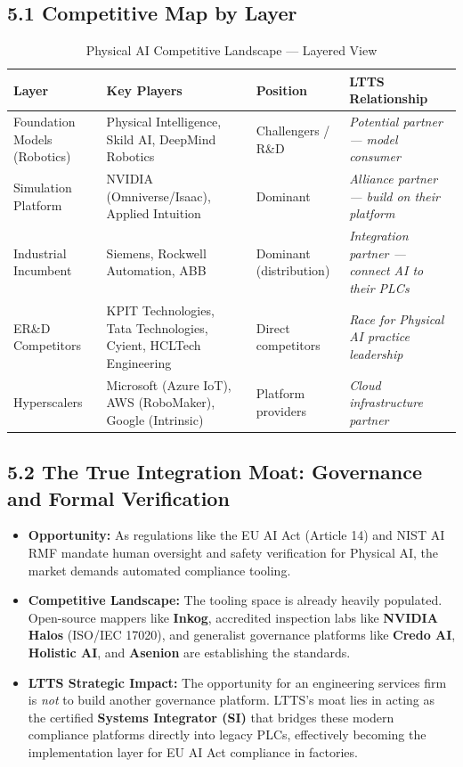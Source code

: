 \documentclass[11pt,a4paper]{article}
\begin{document}
\subsection{5.1 Competitive Map by Layer}
\begin{table}[h!]
\centering
\small
\begin{tabularx}{\textwidth}{@{}l X l X@{}}
\toprule
\textbf{Layer} & \textbf{Key Players} & \textbf{Position} & \textbf{LTTS Relationship} \\
\midrule
Foundation Models (Robotics) & Physical Intelligence, Skild AI, DeepMind Robotics & Challengers / R\&D & \textit{Potential partner --- model consumer} \\
Simulation Platform & NVIDIA (Omniverse/Isaac), Applied Intuition & Dominant & \textit{Alliance partner --- build on their platform} \\
Industrial Incumbent & Siemens, Rockwell Automation, ABB & Dominant (distribution) & \textit{Integration partner --- connect AI to their PLCs} \\
ER\&D Competitors & KPIT Technologies, Tata Technologies, Cyient, HCLTech Engineering & Direct competitors & \textit{Race for Physical AI practice leadership} \\
Hyperscalers & Microsoft (Azure IoT), AWS (RoboMaker), Google (Intrinsic) & Platform providers & \textit{Cloud infrastructure partner} \\
\bottomrule
\end{tabularx}
\caption{Physical AI Competitive Landscape --- Layered View}
\end{table}

\subsection{5.2 The True Integration Moat: Governance and Formal Verification}
\begin{itemize}
    \item \textbf{Opportunity:} As regulations like the EU AI Act (Article 14) and NIST AI RMF mandate human oversight and safety verification for Physical AI, the market demands automated compliance tooling.
    \item \textbf{Competitive Landscape:} The tooling space is already heavily populated. Open-source mappers like \textbf{Inkog}, accredited inspection labs like \textbf{NVIDIA Halos} (ISO/IEC 17020), and generalist governance platforms like \textbf{Credo AI}, \textbf{Holistic AI}, and \textbf{Asenion} are establishing the standards.
    \item \textbf{LTTS Strategic Impact:} The opportunity for an engineering services firm is \textit{not} to build another governance platform. LTTS's moat lies in acting as the certified \textbf{Systems Integrator (SI)} that bridges these modern compliance platforms directly into legacy PLCs, effectively becoming the implementation layer for EU AI Act compliance in factories.
\end{itemize}
\end{document}
